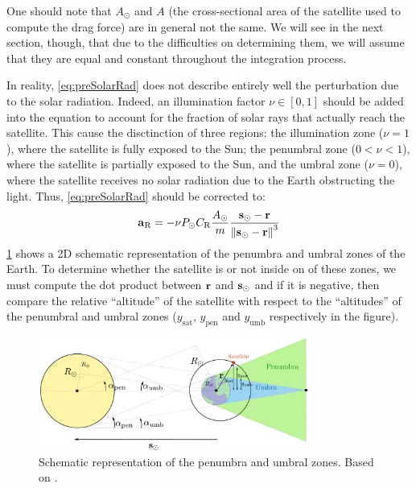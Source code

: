 \documentclass[../main.tex]{subfiles}
\begin{document}
One should note that $A_\odot$ and $A$ (the cross-sectional area of the satellite used to compute the drag force) are in general not the same. We will see in the next section, though, that due to the difficulties on determining them, we will assume that they are equal and constant throughout the integration process.

In reality, \cref{eq:preSolarRad} does not describe entirely well the perturbation due to the solar radiation. Indeed, an illumination factor $\nu\in[0,1]$ should be added into the equation to account for the fraction of solar rays that actually reach the satellite. This cause the disctinction of three regions: the illumination zone ($\nu=1$), where the satellite is fully exposed to the Sun; the penumbral zone ($0<\nu<1$), where the satellite is partially exposed to the Sun, and the umbral zone ($\nu=0$), where the satellite receives no solar radiation due to the Earth obstructing the light.
Thus, \cref{eq:preSolarRad} should be corrected to:
\begin{equation}\label{eq:SolarRad}
  {\boldsymbol{\mathrm{a}}}_{\mathrm{R}}=-\nu P_{\odot} C_{\mathrm{R}} \frac{A_\odot}{m} \frac{\boldsymbol{\mathrm{s}}_\odot-\boldsymbol{\mathrm{r}}}{\left\|\boldsymbol{\mathrm{s}}_\odot-\boldsymbol{\mathrm{r}}\right\|^3}
\end{equation}
\cref{fig:penumbra} shows a 2D schematic representation of the penumbra and umbral zones of the Earth. To determine whether the satellite is or not inside on of these zones, we must compute the dot product between $\boldsymbol{\mathrm{r}}$ and $\boldsymbol{\mathrm{s}}_\odot$ and if it is negative, then compare the relative ``altitude'' of the satellite with respect to the ``altitudes'' of the penumbral and umbral zones ($y_\mathrm{sat}$, $y_{\mathrm{pen}}$ and $y_{\mathrm{umb}}$ respectively in the figure).
\begin{figure}[ht]
  \centering
  \includegraphics[width=0.8\textwidth]{Images/penumbra.pdf}
  \caption{Schematic representation of the penumbra and umbral zones. Based on \cite{vallado}.}
  \label{fig:penumbra}
\end{figure}
\end{document}
